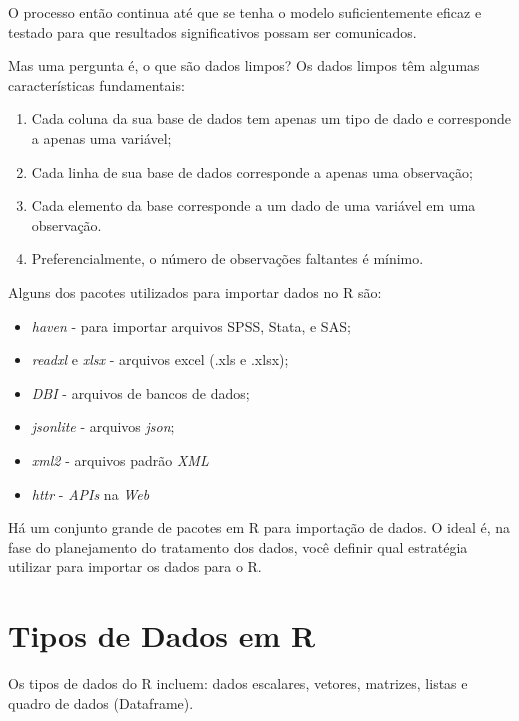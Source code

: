 \documentclass[12pt,a4paper,oneside]{erdc}
\begin{document}
O processo então continua até que se tenha o modelo suficientemente eficaz e testado para que resultados significativos possam ser comunicados.


Mas uma pergunta é, o que são dados limpos? Os dados limpos têm algumas características fundamentais:

\begin{enumerate}
	\item Cada coluna da sua base de dados tem apenas um tipo de dado e corresponde a apenas uma variável;
	\item Cada linha de sua base de dados corresponde a apenas uma observação;
	\item Cada elemento da base corresponde a um dado de uma variável em uma observação. 
	\item Preferencialmente, o número de observações faltantes é mínimo.
\end{enumerate}


Alguns dos pacotes utilizados para importar dados no R são:

\begin{itemize}
	\item \textit{haven} - para importar arquivos SPSS, Stata, e SAS;
	\item \textit{readxl} e \textit{xlsx} - arquivos excel (.xls e .xlsx);
	\item \textit{DBI} - arquivos de bancos de dados;
	\item \textit{jsonlite} - arquivos \textit{json};
	\item \textit{xml2} - arquivos padrão \textit{XML}
	\item \textit{httr} - \textit{APIs} na \textit{Web}
\end{itemize}

Há um conjunto grande de pacotes em R para importação de dados. O ideal é, na fase do planejamento do tratamento dos dados, você definir qual estratégia utilizar para importar os dados para o R.


\section{Tipos de Dados em R}

Os tipos de dados do R incluem: dados escalares, vetores, matrizes, listas e quadro de dados (Dataframe).
\end{document}
